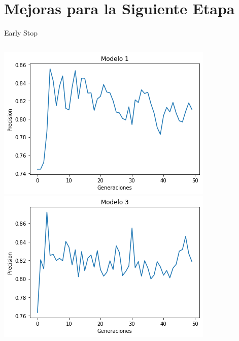 \documentclass{beamer}
\begin{document}
\section{Mejoras para la Siguiente Etapa}
\begin{frame}{Early Stop}
    \begin{columns}
    \includegraphics[width=\columnwidth]{Imagenes/AG1.png}
    \includegraphics[width=\columnwidth]{Imagenes/AG3.png}
    

\end{columns}
\end{frame}
\end{document}

